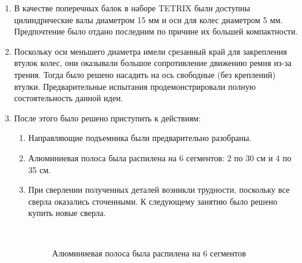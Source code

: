 \begin{enumerate}
\begin{enumerate}
      \item В качестве поперечных балок в наборе TETRIX были доступны цилиндрические валы диаметром 15 мм и оси для колес диаметром 5 мм. Предпочтение было отдано последним по причине их большей компактности.
       
      \item Поскольку оси меньшего диаметра имели срезанный край для закрепления втулок колес, они оказывали большое сопротивление движению ремня из-за трения. Тогда было решено насадить на ось свободные (без креплений) втулки. Предварительные испытания продемонстрировали полную состоятельность данной идеи.
        
      \item После этого было решено приступить к действиям:
      \begin{enumerate}
      	\item Направляющие подъемника были предварительно разобраны.
      	
      	\item  Алюминиевая полоса была распилена на 6 сегментов: 2 по 30 см и 4 по 35 см.
      	
      	\item При сверлении полученных деталей возникли трудности, поскольку все сверла оказались сточенными. К следующему занятию было решено купить новые сверла.
      	
      	\begin{figure}[H]
      		\begin{minipage}[h]{0.2\linewidth}
      			\center  
      		\end{minipage}
      		\begin{minipage}[h]{0.6\linewidth}
      			\caption{Алюминиевая полоса была распилена на 6 сегментов}
      		\end{minipage}
      	\end{figure}
      	

\end{enumerate}
\end{enumerate}
\end{enumerate}
